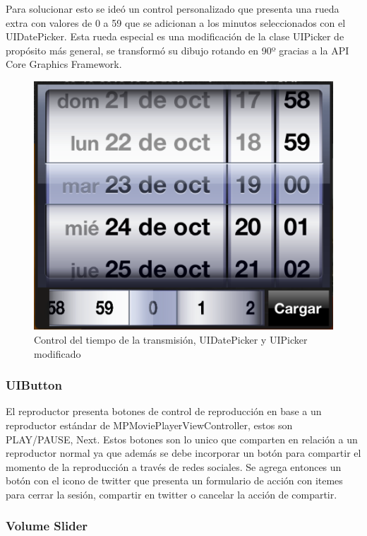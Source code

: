 Para solucionar esto se ideó un control personalizado que presenta una rueda extra con valores de 0 a 59 que se adicionan a los minutos seleccionados con el UIDatePicker. Esta rueda especial es una modificación de la clase UIPicker de propósito más general, se transformó su dibujo rotando en 90º gracias a la API Core Graphics Framework. 

\begin{figure}[H]
	\centering
	\includegraphics[scale=0.5]{imgs/datepicker-mod.png}
	\caption{Control del tiempo de la transmisión, UIDatePicker y UIPicker modificado}
	\label{datepicker-mod}	
\end{figure}
 
		\subsubsection{UIButton}
		El reproductor presenta botones de control de reproducción en base a un reproductor estándar de MPMoviePlayerViewController, estos son PLAY/PAUSE, Next. Estos botones son lo unico que comparten en relación a un reproductor normal ya que además se debe incorporar un botón para compartir el momento de la reproducción a través de redes sociales. Se agrega entonces un botón con el icono de twitter que presenta un formulario de acción con itemes para cerrar la sesión, compartir en twitter o cancelar la acción de compartir.
		
		\subsubsection{Volume Slider}

